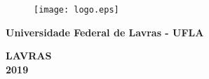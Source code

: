 \documentclass[12pt]{article}
\begin{document}
\begin{titlepage}
    \begin{figure}
    \vspace{-2cm}
    \centering
    \texttt{[image: logo.eps]}
    \label{fig:logo}
    \end{figure}

\centering\advance\topskip-1cm\huge{}
\vspace{6cm}

\large\textbf{Universidade Federal de Lavras - UFLA}

\vspace{8.5cm}

\textbf{LAVRAS\\2019}

\end{titlepage}


\end{document}
